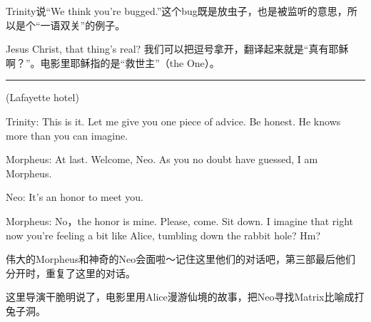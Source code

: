 \documentclass[UTF8]{ctexart}
\newcommand{\myparsep}{\noindent \rule[0.5ex]{\linewidth}{1pt}}
\newenvironment{myquote}{\color{green} \setlength{\leftskip}{6em} \setlength{\rightskip}{4em} \setlength{\parindent}{-2em}}{\par}
\begin{document}
Trinity说“We think you're bugged.”这个bug既是放虫子，也是被监听的意思，所以是个“一语双关”的例子。

Jesus Christ, that thing's real? 我们可以把逗号拿开，翻译起来就是“真有耶稣啊？”。电影里耶稣指的是“救世主”（the One）。

\myparsep

\begin{myquote}
(Lafayette hotel)

Trinity: This is it. Let me give you one piece of advice. Be honest. He knows more than you can imagine.

Morpheus: At last. Welcome, Neo. As you no doubt have guessed, I am Morpheus.

Neo: It's an honor to meet you.

Morpheus: No，the honor is mine. Please, come. Sit down. I imagine that right now you're feeling a bit like Alice, tumbling down the rabbit hole? Hm?
\end{myquote}

伟大的Morpheus和神奇的Neo会面啦～记住这里他们的对话吧，第三部最后他们分开时，重复了这里的对话。

这里导演干脆明说了，电影里用Alice漫游仙境的故事，把Neo寻找Matrix比喻成打兔子洞。
\end{document}
